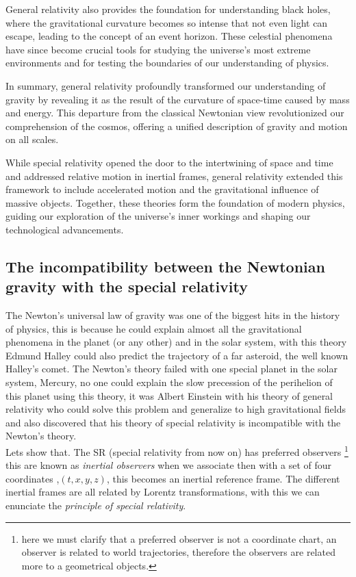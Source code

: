     General relativity also provides the foundation for understanding black holes, where the gravitational curvature becomes so intense that not even light can escape, leading to the concept of an event horizon. These celestial phenomena have since become crucial tools for studying the universe's most extreme environments and for testing the boundaries of our understanding of physics.

    In summary, general relativity profoundly transformed our understanding of gravity by revealing it as the result of the curvature of space-time caused by mass and energy. This departure from the classical Newtonian view revolutionized our comprehension of the cosmos, offering a unified description of gravity and motion on all scales.

    While special relativity opened the door to the intertwining of space and time and addressed relative motion in inertial frames, general relativity extended this framework to include accelerated motion and the gravitational influence of massive objects. Together, these theories form the foundation of modern physics, guiding our exploration of the universe's inner workings and shaping our technological advancements.

    \subsection{The incompatibility between the Newtonian gravity with the special relativity}

        The Newton's universal law of gravity was one of the biggest hits in the history of physics, this is because he could explain almost all the gravitational phenomena in the planet (or any other) and in the solar system, with this theory Edmund Halley could also predict the trajectory of a far asteroid, the well known Halley's comet. The Newton's theory failed with one special planet in the solar system, Mercury, no one could explain the slow precession of the perihelion of this planet using this theory, it was Albert Einstein with his theory of general relativity who could solve this problem and generalize to high gravitational fields and also discovered that his theory of special relativity is incompatible with the Newton's theory.\\

        Lets show that. The SR (special relativity from now on) has preferred observers \footnote{here we must clarify that a preferred observer is not a coordinate chart, an observer is related to world trajectories, therefore the observers are related more to a geometrical objects.} this are known as \textit{inertial observers} when we associate then with a set of four coordinates ,$(t,x,y,z)$, this becomes an inertial reference frame. The different inertial frames are all related by Lorentz transformations, with this we can enunciate the \textit{principle of special relativity}.

